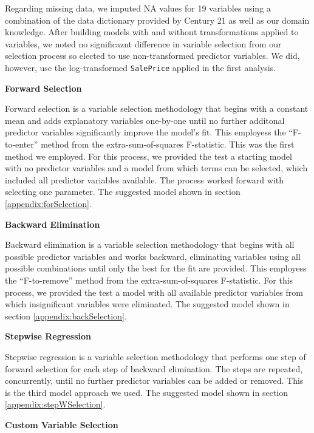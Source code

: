 \documentclass[american,]{article}
\begin{document}
Regarding missing data, we imputed NA values for 19 variables using a
combination of the data dictionary provided by Century 21 as well as our
domain knowledge. After building models with and without transformations
applied to variables, we noted no significaznt difference in variable
selection from our selection process so elected to use non-transformed
predictor variables. We did, however, use the log-transformed
\texttt{SalePrice} applied in the first analysis.

\textbf{Forward Selection}

Forward selection is a variable selection methodology that begins with a
constant mean and adds explanatory variables one-by-one until no further
additonal predictor variables significantly improve the model's fit.
This employess the ``F-to-enter'' method from the extra-sum-of-squares
F-statistic. This was the first method we employed. For this process, we
provided the test a starting model with no predictor variables and a
model from which terms can be selected, which included all predictor
variables available. The process worked forward with selecting one
parameter. The suggested model shown in section
\ref{appendix:forSelection}.

\textbf{Backward Elimination}

Backward elimination is a variable selection methodology that begins
with all possible predictor variables and works backward, eliminating
variables using all possible combinations until only the best for the
fit are provided. This employess the ``F-to-remove'' method from the
extra-sum-of-squares F-statistic. For this process, we provided the test
a model with all available predictor variables from which insignificant
variables were eliminated. The suggested model shown in section
\ref{appendix:backSelection}.

\textbf{Stepwise Regression}

Stepwise regression is a variable selection methodology that performs
one step of forward selection for each step of backward elimination. The
steps are repeated, concurrently, until no further predictor variables
can be added or removed. This is the third model approach we used. The
suggested model shown in section \ref{appendix:stepWSelection}.

\textbf{Custom Variable Selection}
\end{document}
